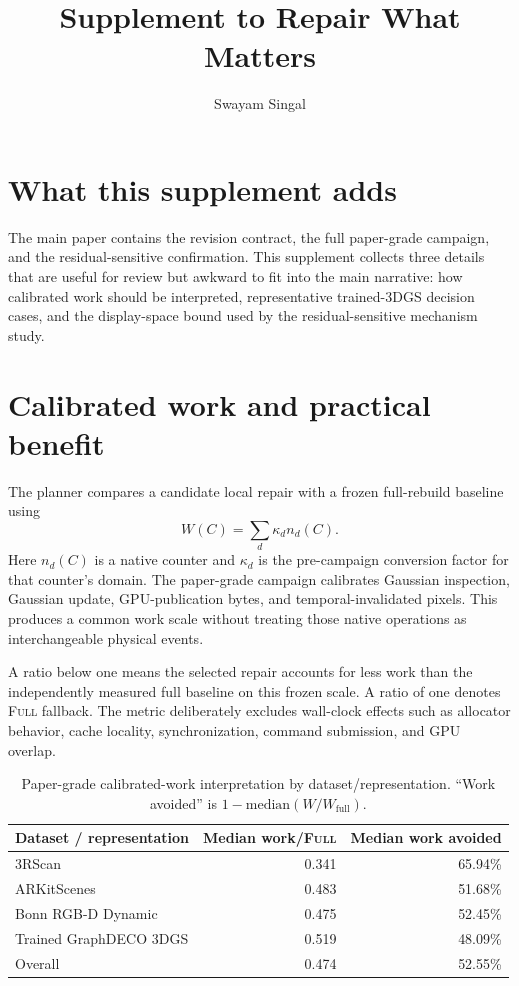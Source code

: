 \documentclass[11pt]{article}
\title{Supplement to Repair What Matters}
\author{Swayam Singal}
\date{}
\begin{document}
\maketitle

\section{What this supplement adds}
The main paper contains the revision contract, the full paper-grade campaign, and the residual-sensitive confirmation. This supplement collects three details that are useful for review but awkward to fit into the main narrative: how calibrated work should be interpreted, representative trained-3DGS decision cases, and the display-space bound used by the residual-sensitive mechanism study.

\section{Calibrated work and practical benefit}
The planner compares a candidate local repair with a frozen full-rebuild baseline using
\[
W(C)=\sum_d \kappa_d n_d(C).
\]
Here $n_d(C)$ is a native counter and $\kappa_d$ is the pre-campaign conversion factor for that counter's domain. The paper-grade campaign calibrates Gaussian inspection, Gaussian update, GPU-publication bytes, and temporal-invalidated pixels. This produces a common work scale without treating those native operations as interchangeable physical events.

A ratio below one means the selected repair accounts for less work than the independently measured full baseline on this frozen scale. A ratio of one denotes \textsc{Full} fallback. The metric deliberately excludes wall-clock effects such as allocator behavior, cache locality, synchronization, command submission, and GPU overlap.

\begin{table}[h]
\centering
\caption{Paper-grade calibrated-work interpretation by dataset/representation. ``Work avoided'' is $1-\mathrm{median}(W/W_{\mathrm{full}})$.}
\begin{tabular}{lrr}
\toprule
Dataset / representation & Median work/\textsc{Full} & Median work avoided \\
\midrule
3RScan & 0.341 & 65.94\% \\
ARKitScenes & 0.483 & 51.68\% \\
Bonn RGB-D Dynamic & 0.475 & 52.45\% \\
Trained GraphDECO 3DGS & 0.519 & 48.09\% \\
Overall & 0.474 & 52.55\% \\
\bottomrule
\end{tabular}
\end{table}
\end{document}
